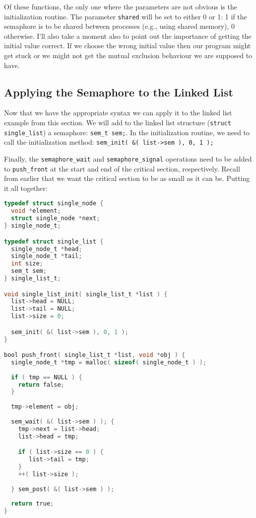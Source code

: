 Of these functions, the only one where the parameters are not obvious is the initialization routine. The parameter \texttt{shared} will be set to either 0 or 1: 1 if the semaphore is to be shared between processes (e.g., using shared memory), 0 otherwise. I'll also take a moment also to point out the importance of getting the initial value correct. If we choose the wrong initial value then our program might get stuck or we might not get the mutual exclusion behaviour we are supposed to have.

\subsection*{Applying the Semaphore to the Linked List}

Now that we have the appropriate syntax we can apply it to the linked list example from this section. We will add to the linked list structure (\texttt{struct single\_list}) a semaphore: \texttt{sem\_t sem;}. In the initialization routine, we need to call the initialization method: \texttt{sem\_init( \&( list->sem ), 0, 1 );}

Finally, the \texttt{semaphore\_wait} and \texttt{semaphore\_signal} operations need to be added to \texttt{push\_front} at the start and end of the critical section, respectively. Recall from earlier that we want the critical section to be as small as it can be. Putting it all together:

\begin{lstlisting}[language=C]
typedef struct single_node {
  void *element;
  struct single_node *next;
} single_node_t;

typedef struct single_list {
  single_node_t *head;
  single_node_t *tail;
  int size;
  sem_t sem;
} single_list_t;

void single_list_init( single_list_t *list ) {
  list->head = NULL;
  list->tail = NULL;
  list->size = 0;

  sem_init( &( list->sem ), 0, 1 );
}

bool push_front( single_list_t *list, void *obj ) {
  single_node_t *tmp = malloc( sizeof( single_node_t ) );
  
  if ( tmp == NULL ) {
    return false;
  }
  
  tmp->element = obj;
  
  sem_wait( &( list->sem ) ); {
    tmp->next = list->head;
    list->head = tmp;

    if ( list->size == 0 ) {
       list->tail = tmp;
    }
    ++( list->size );
  
  } sem_post( &( list->sem ) );  
  
  return true;
}
\end{lstlisting}

